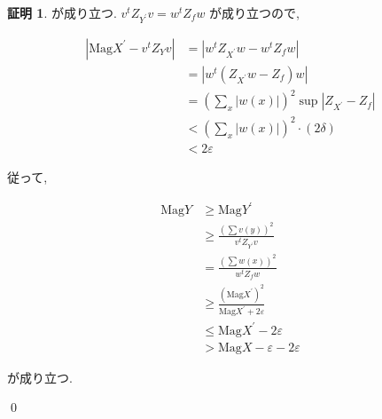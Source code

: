 \documentclass[10pt, fleqn, label-section=none]{bxjsarticle}
\theoremstyle{definition}
\newtheorem*{pf*}{証明}
\newcommand{\veps}{\varepsilon}
\newcommand{\abs}[1]{\left|#1\right|}
\renewcommand{\;}{\, ; \,}
\newcommand{\Mag}{\textrm{Mag}}
\begin{document}
\begin{pf*}
が成り立つ. $v^t Z_{Y^\prime } v = w^t Z_{f} w$ が成り立つので, 

\begin{align*} \abs{\Mag X^\prime - v^t Z_{Y} v} 
&=  \abs{w^t Z_{X^\prime} w - w^t Z_{f} w} 
\\&=  \abs{w^t (Z_{X^\prime} w - Z_{f}) w} 
\\&= (\sum_x \abs{w(x)})^2 \sup \abs{Z_{X^\prime}  - Z_{f}} 
\\& < (\sum_x \abs{w(x)})^2 \cdot (2 \delta )
\\& < 2 \veps
 \end{align*}

従って, 

\begin{align*} \Mag Y 
&\geq \Mag Y^\prime 
\\&\geq \frac{(\sum v(y) )^2}{v^t Z_{Y^\prime} v} 
\\&= \frac{(\sum w(x) )^2}{w^t Z_{f} w}
\\&\geq  \frac{(\Mag X^\prime ) ^2 }{\Mag X^\prime + 2 \veps}
\\& \leq  \Mag X^\prime - 2 \veps 
\\& > \Mag X - \veps - 2 \veps \end{align*}

が成り立つ. 


\qed
\end{pf*}
\end{document}
